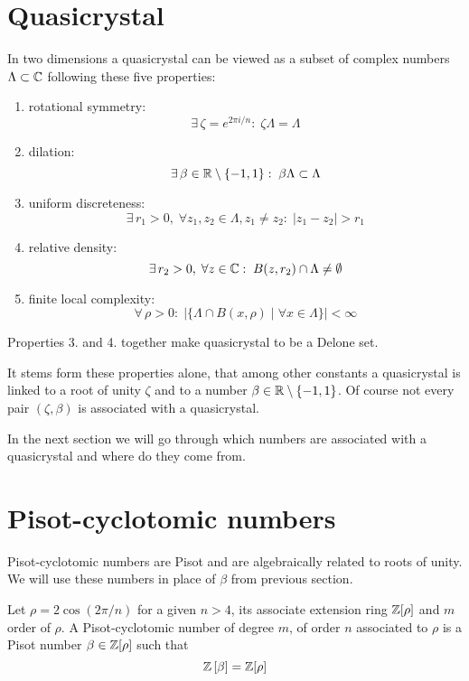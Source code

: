 \documentclass[text.tex]{subfiles}
\begin{document}
\section{Quasicrystal}
In two dimensions a quasicrystal can be viewed as a subset of complex numbers $\Lambda\subset\mathbb{C}$ following these five properties:

\begin{enumerate}
\item rotational symmetry: $$\exists\,\zeta = e^{2\pi i/n}:\; \zeta\Lambda = \Lambda$$
\item dilation: $$\exists\,\beta\in\mathbb{R}\setminus\{-1,1\}:\; \beta\Lambda\subset \Lambda$$
\item uniform discreteness: $$\exists\,r_1>0,\; \forall z_1,z_2\in\Lambda, z_1\neq z_2:\; |z_1-z_2|>r_1$$
\item relative density: $$\exists\,r_2>0,\; \forall z\in\mathbb{C}:\; B(z,r_2)\cap\Lambda \neq \emptyset$$
\item finite local complexity: $$\forall\,\rho>0:\;\big|\{\Lambda\cap B(x,\rho)\;|\;\forall x\in\Lambda\}\big| < \infty$$
\end{enumerate}

\begin{remark}
Properties 3. and 4. together make quasicrystal to be a Delone set.
\end{remark}

It stems form these properties alone, that among other constants a quasicrystal is linked to a root of unity $\zeta$ and to a number $\beta\in\mathbb{R}\setminus\{-1,1\}$. Of course not every pair $(\zeta, \beta)$ is associated with a quasicrystal.

In the next section we will go through which numbers are associated with a quasicrystal and where do they come from. 

\section{Pisot-cyclotomic numbers}
Pisot-cyclotomic numbers are Pisot and are algebraically related to roots of unity. We will use these numbers in place of $\beta$ from previous section. 

\begin{definition}\label{def_pisotCyclotomic}
Let $\rho = 2\cos\left(2\pi/n\right)$ for a given $n>4$, its associate extension ring $\mathbb{Z}[\rho]$ and $m$ order of $\rho$. A Pisot-cyclotomic number of degree $m$, of order $n$ associated to $\rho$ is a Pisot number $\beta \in \mathbb{Z}[\rho]$ such that
$$\mathbb{Z}\left[\beta\right] = \mathbb{Z}[\rho]$$
\end{definition}
\end{document}
